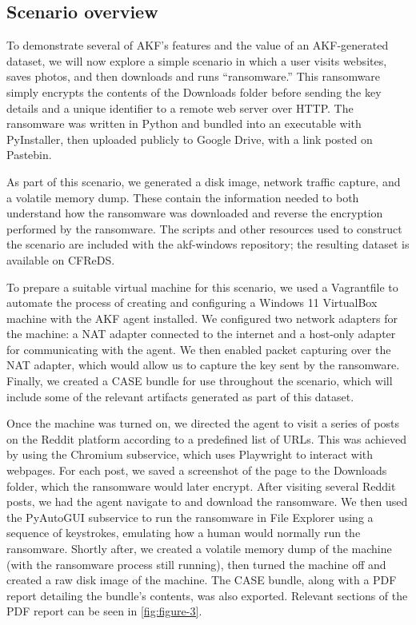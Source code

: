 \subsection{Scenario overview}\label{scenario-overview}

To demonstrate several of AKF's features and the value of an
AKF-generated dataset, we will now explore a simple scenario in which a
user visits websites, saves photos, and then downloads and runs
``ransomware.'' This ransomware simply encrypts the contents of the
Downloads folder before sending the key details and a unique identifier
to a remote web server over HTTP. The ransomware was written in Python
and bundled into an executable with PyInstaller, then uploaded publicly
to Google Drive, with a link posted on Pastebin.

As part of this scenario, we generated a disk image, network traffic
capture, and a volatile memory dump. These contain the information
needed to both understand how the ransomware was downloaded and reverse
the encryption performed by the ransomware. The scripts and other
resources used to construct the scenario are included with the
akf-windows repository; the resulting dataset is available on CFReDS.

To prepare a suitable virtual machine for this scenario, we used a
Vagrantfile to automate the process of creating and configuring a
Windows 11 VirtualBox machine with the AKF agent installed. We
configured two network adapters for the machine: a NAT adapter connected
to the internet and a host-only adapter for communicating with the
agent. We then enabled packet capturing over the NAT adapter, which
would allow us to capture the key sent by the ransomware. Finally, we
created a CASE bundle for use throughout the scenario, which will
include some of the relevant artifacts generated as part of this
dataset.

Once the machine was turned on, we directed the agent to visit a series
of posts on the Reddit platform according to a predefined list of URLs.
This was achieved by using the Chromium subservice, which uses
Playwright to interact with webpages. For each post, we saved a
screenshot of the page to the Downloads folder, which the ransomware
would later encrypt. After visiting several Reddit posts, we had the
agent navigate to and download the ransomware. We then used the
PyAutoGUI subservice to run the ransomware in File Explorer using a
sequence of keystrokes, emulating how a human would normally run the
ransomware. Shortly after, we created a volatile memory dump of the
machine (with the ransomware process still running), then turned the
machine off and created a raw disk image of the machine. The CASE
bundle, along with a PDF report detailing the bundle's contents, was
also exported. Relevant sections of the PDF report can be seen in
\autoref{fig:figure-3}.

